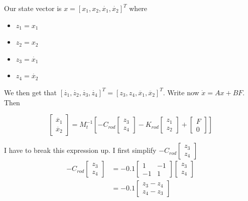 \documentclass[12pt,a4paper, onecolumn]{exam}
\begin{document}
\begin{questions}
\begin{parts}
\begin{solution}
    Our state vector is $ x = \left[ x_1, x_2, \dot{x_1}, \dot{x_2} \right]^T  $ where 
    \begin{itemize}
      \item $ z_1 = x_1 $
      \item $ z_2 = x_2 $
      \item $ z_3 = \dot{x_1} $
      \item $ z_4 = \dot{x_2} $    
    \end{itemize} 
    We then get that $ \left[ \dot{z_1}, \dot{z_2}, \dot{z_3}, \dot{z_4} \right]^T = \left[ z_3, z_4, \ddot{x_1}, \ddot{x_2} \right]^T  $. Write now $ \dot{x} = Ax+BF $. Then 
    
    \[
        \begin{bmatrix}
            \ddot{x_1}\\
            \ddot{x_2}
        \end{bmatrix} = M_t^{-1} \left[ -C_{rod} \begin{bmatrix}
            z_3\\
            z_4
        \end{bmatrix} - K_{rod} \begin{bmatrix}
            z_1\\
            z_2
        \end{bmatrix} + \begin{bmatrix}
            F\\
            0
        \end{bmatrix}  \right]  
    \]

    I have to break this expression up. I first simplify $ -C_{rod} \begin{bmatrix}
        z_3\\
        z_4
    \end{bmatrix}  $
    \begin{align*}
      -C_{rod} \begin{bmatrix}
        z_3\\
        z_4
    \end{bmatrix} &= -0.1 \begin{bmatrix}
        1&-1\\
        -1&1
    \end{bmatrix} \begin{bmatrix}
        z_3\\
        z_4
    \end{bmatrix}  \\
    &= -0.1 \begin{bmatrix}
        z_3 - z_4\\
        z_4 - z_3
    \end{bmatrix} 
    \end{align*}


\end{solution}
\end{parts}
\end{questions}
\end{document}
